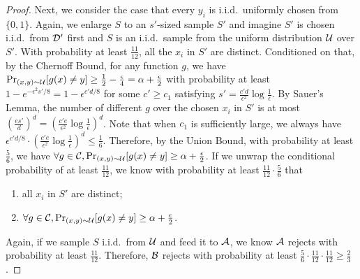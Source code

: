 \begin{proof}
Next, we consider the case that every $y_i$ is i.i.d.\ uniformly chosen from $\{0,1\}$. Again, we enlarge $S$ to an $s'$-sized sample $S'$ and imagine $S'$ is chosen i.i.d.\ from ${\mathcal{D}}'$ first and $S$ is an i.i.d.\ sample from the uniform distribution ${\mathcal{U}}$ over $S'$. With probability at least $\frac {11}{12}$, all the $x_i$ in $S'$ are distinct. Conditioned on that, by the Chernoff Bound, for any function $g$, we have $\Pr_{(x,y)\sim{\mathcal{U}}}[g(x)\neq y]\geq \frac 12-\frac\epsilon 4=\alpha+\frac\epsilon 2$ with probability at least $1-e^{-\epsilon^2s'/8}= 1-\epsilon^{c'd/8}$ for some $c'\geq c_1$ satisfying $s'=\frac{c'd}{\epsilon^2}\log\frac 1\epsilon$. By Sauer's Lemma, the number of different $g$ over the chosen $x_i$ in $S'$ is at most $(\frac{es'}{d})^d=(\frac{c'e}{\epsilon^2}\log\frac{1}{\epsilon})^d$. Note that when $c_1$ is sufficiently large, we always have $\epsilon^{c'd/8}\cdot (\frac{c'e}{\epsilon^2}\log\frac{1}{\epsilon})^d\leq \frac 16$. Therefore, by the Union Bound, with probability at least $\frac 56$, we have $\forall g\in{\mathcal{C}},\Pr_{(x,y)\sim{\mathcal{U}}}[g(x)\neq y]\geq\alpha+\frac\epsilon 2$. If we unwrap the conditional probability of at least $\frac{11}{12}$, we know with probability at least $\frac{11}{12}\cdot \frac{5}{6}$ that
\begin{enumerate}
\item all $x_i$ in $S'$ are distinct;
\item $\forall g\in{\mathcal{C}},\Pr_{(x,y)\sim{\mathcal{U}}}[g(x)\neq y]\geq\alpha+\frac\epsilon 2$.
\end{enumerate}
Again, if we sample $S$ i.i.d.\ from ${\mathcal{U}}$ and feed it to ${\mathcal{A}}$, we know ${\mathcal{A}}$ rejects with probability at least $\frac{11}{12}$. Therefore, ${\mathcal B}$ rejects with probability at least $\frac{5}{6}\cdot\frac{11}{12}\cdot\frac{11}{12}\geq \frac 23$.
\end{proof}